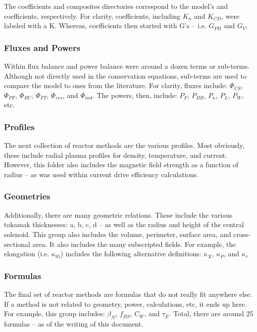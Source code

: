 The coefficients and composites directories correspond to the model's  and  coefficients, respectively. For clarity,  coefficients, including $K_n$ and $K_{CD}$, were labeled with a K. Whereas,  coefficients then started with G's -- i.e. $G_{PB}$ and $G_V$.

\subsubsection{Fluxes and Powers}

Within flux balance and power balance were around a dozen terms or sub-terms. Although not directly used in the conservation equations, sub-terms are used to compare the model to ones from the literature. For clarity, fluxes include: $\Phi_{CS}$, $\Phi_{PF}$, $\Phi_{RU}$, $\Phi_{FT}$, $\Phi_{res}$, and $\Phi_{ind}$. The powers, then, include: $P_F$, $P_{BR}$, $P_\kappa$, $P_L$, $P_W$, etc. 

\subsubsection{Profiles}

The next collection of reactor methods are the various profiles. Most obviously, these include radial plasma profiles for density, temperature, and current. However, this folder also includes the magnetic field strength as a function of radius -- as was used within current drive efficiency calculations.

\subsubsection{Geometries}

Additionally, there are many geometric relations. These include the various tokamak thicknesses: a, b, c, d -- as well as the radius and height of the central solenoid. This group also includes the volume, perimeter, surface area, and cross-sectional area. It also includes the many subscripted fields. For example, the elongation (i.e. $\kappa_{95}$) includes the following alternative definitions: $\kappa_X$, $\kappa_P$, and $\kappa_\tau$

\subsubsection{Formulas}

The final set of reactor methods are formulas that do not really fit anywhere else. If a method is not related to geometry, power, calculations, etc, it ends up here. For example, this group includes: $\beta_N$, $f_{BS}$, $C_W$, and $\tau_E$. Total, there are around 25 formulas -- as of the writing of this document.

